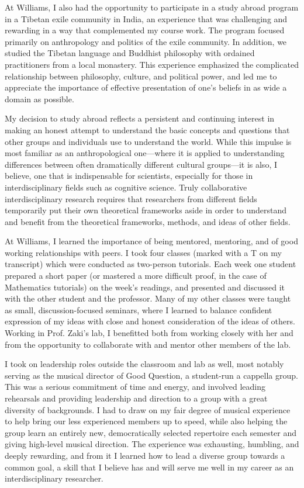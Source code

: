 \documentclass[12pt]{article}
\begin{document}
At Williams, I also had the opportunity to participate in a study abroad program in a Tibetan exile community in India, an experience that was challenging and rewarding in a way that complemented my course work.  The program focused primarily on anthropology and politics of the exile community.  In addition, we studied the Tibetan language and Buddhist philosophy with ordained practitioners from a local monastery.  This experience emphasized the complicated relationship between philosophy, culture, and political power, and led me to appreciate the importance of effective presentation of one's beliefs in as wide a domain as possible.

My decision to study abroad reflects a persistent and continuing interest in making an honest attempt to understand the basic concepts and questions that other groups and individuals use to understand the world.  While this impulse is most familiar as an anthropological one---where it is applied to understanding differences between often dramatically different cultural groups---it is also, I believe, one that is indispensable for scientists, especially for those in interdisciplinary fields such as cognitive science.  Truly collaborative interdisciplinary research requires that researchers from different fields temporarily put their own theoretical frameworks aside in order to understand and benefit from the theoretical frameworks, methods, and ideas of other fields.  

At Williams, I learned the importance of being mentored, mentoring, and of good working relationships with peers.  I took four classes (marked with a T on my transcript) which were conducted as two-person tutorials.  Each week one student prepared a short paper (or mastered a more difficult proof, in the case of Mathematics tutorials) on the week's readings, and presented and discussed it with the other student and the professor.  
Many of my other classes were taught as small, discussion-focused seminars, where I learned to balance confident expression of my ideas with close and honest consideration of the ideas of others.  
 Working in Prof. Zaki's lab, I benefitted both from working closely with her and from the opportunity to collaborate with and mentor other members of the lab.  

I took on leadership roles outside the classroom and lab as well, most notably serving as the musical director of Good Question, a student-run a cappella group.  This was a serious commitment of time and energy, and involved leading rehearsals and providing leadership and direction to a group with a great diversity of backgrounds.  I had to draw on my fair degree of musical experience to help bring our less experienced members up to speed, while also helping the group learn an entirely new, democratically selected repertoire each semester and giving high-level musical direction.  The experience was exhausting, humbling, and deeply rewarding, and from it I learned how to lead a diverse group towards a common goal, a skill that I believe has and will serve me well in my career as an interdisciplinary researcher.
\end{document}

